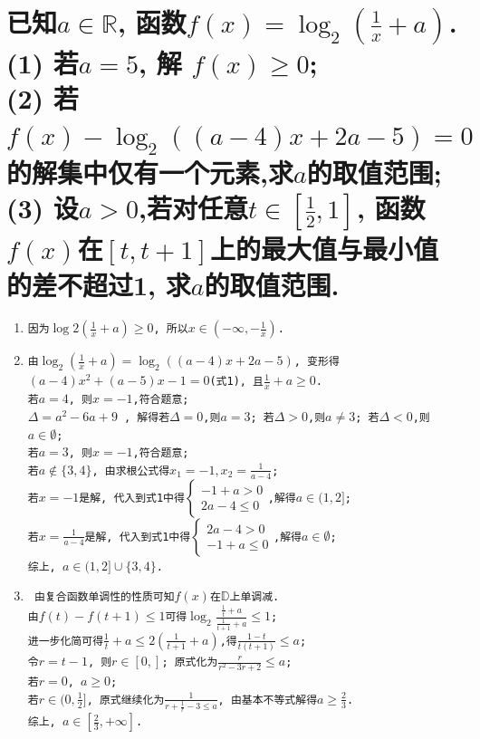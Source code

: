 \documentclass[oneside]{book}
\newcommand{\1}{\underline{\makebox[1cm]{}}}
\newcommand{\2}{\underline{\makebox[2cm]{}}}
\newcommand{\3}{\underline{\makebox[3cm]{}}}
\newcommand{\4}{\underline{\makebox[4cm]{}}}
\newcommand{\lge}{\large \texttt}
\newlength{\la}
\begin{document}
        \section{
            已知$a \in \mathbb{R}$, 函数$f(x)= \log_2{(\frac{1}{x}+a)}$. 
        \\(1) 若$a = 5$, 解 $f(x) \geq 0$;
        \\(2) 若$f(x) - \log_2{((a-4)x +2a -5)} = 0$的解集中仅有一个元素,求$a$的取值范围;
        \\(3) 设$a > 0$,若对任意$t \in [\frac{1}{2}, 1]$, 函数$f(x)$在$[t, t + 1]$上的最大值与最小值的差不超过1, 求$a$的取值范围.
        }
        \begin{enumerate}[(1)]
            \item \lge{因为$\log{2}{(\frac{1}{x}+a)} \geq 0$, 所以$x \in (- \infty, -\frac{1}{x}) $.}
            \item \lge{由$\log_2{(\frac{1}{x}+a)} = \log_2{((a - 4)x + 2a - 5)}$, 变形得$(a-4)x^2 + (a-5)x - 1 = 0$(式1), 且$\frac{1}{x} + a \geq 0$.
                \\若$ a = 4 $, 则$ x = -1$,符合题意;
                \\ $\Delta = a^2 - 6a + 9$ , 解得若$\Delta = 0$,则$a = 3$; 若$\Delta > 0$,则$a \neq 3$; 若$\Delta < 0$,则 $a \in \emptyset$;
                \\若$a = 3$, 则$x = -1$,符合题意;
                \\若$a \notin \{3, 4\}$, 由求根公式得$x_1 = -1, x_2 = \frac{1}{a-4}$;
                \\若$x = -1$是解, 代入到式1中得$\begin{cases} -1 + a > 0 \\ 2a - 4 \leq 0\end{cases}$,解得$a \in (1, 2]$;
                \\若$x = \frac{1}{a-4}$是解, 代入到式1中得$\begin{cases} 2a - 4 > 0 \\ -1 + a \leq0\end{cases}$,解得$a \in \emptyset$;
                \\综上, $a \in (1, 2]\cup \{3,4\}$.
            }
            \item \lge{
                由复合函数单调性的性质可知$f(x)$在$\mathbb{D}$上单调减.
                \\由$f(t)-f(t+1) \leq 1$可得$\log_2{\frac{\frac{1}{t}+a}{\frac{1}{t+1}+a}} \leq 1$;
                \\进一步化简可得$\frac{1}{t} + a \leq 2(\frac{1}{t+1}+a)$,得$\frac{1 - t}{t(t+1)} \leq a$;
                \\令$r = t -1$, 则$r \in [0, ]$; 原式化为$\frac{r}{r^2 - 3r + 2} \leq a$;
                \\若$r = 0$, $a \geq 0$;
                \\若$r \in (0, \frac{1}{2}]$, 原式继续化为$\frac{1}{r+\frac{1}{r}-3 \leq a}$, 由基本不等式解得$a \geq \frac{2}{3}$.
                \\综上, $a \in [\frac{2}{3}, +\infty]$.
            } 
            \end{enumerate}
\end{document}
